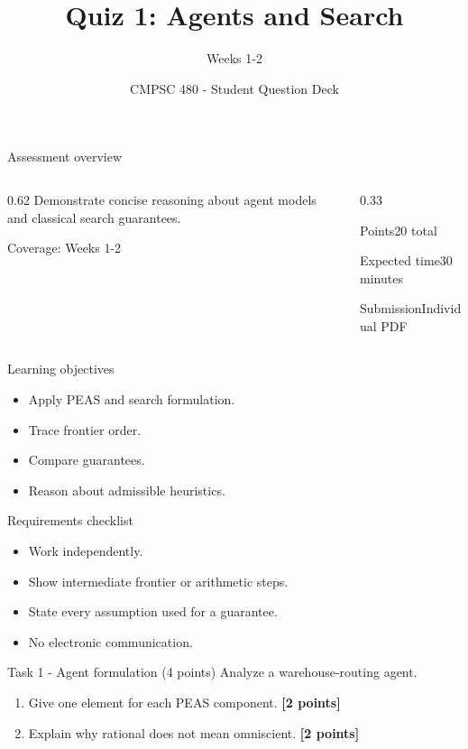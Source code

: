 \documentclass[aspectratio=169,11pt]{beamer}
\title[Quiz 1 Questions]{Quiz 1: Agents and Search}
\subtitle{Weeks 1-2}
\author{CMPSC 480 - Student Question Deck}
\date{}
\begin{document}
\begin{frame}
  \titlepage
\end{frame}

\begin{frame}{Assessment overview}
\begin{columns}[T,onlytextwidth]
\begin{column}{0.62\textwidth}
\Large Demonstrate concise reasoning about agent models and classical search guarantees.

\vspace{0.35cm}
\normalsize
Coverage: Weeks 1-2
\end{column}
\begin{column}{0.33\textwidth}
\begin{block}{Points}20 total\end{block}
\begin{block}{Expected time}30 minutes\end{block}
\begin{block}{Submission}Individual PDF\end{block}
\end{column}
\end{columns}
\end{frame}

\begin{frame}{Learning objectives}
\begin{itemize}
  \item Apply PEAS and search formulation.
  \item Trace frontier order.
  \item Compare guarantees.
  \item Reason about admissible heuristics.
\end{itemize}
\end{frame}

\begin{frame}{Requirements checklist}
\small
\begin{itemize}
  \item Work independently.
  \item Show intermediate frontier or arithmetic steps.
  \item State every assumption used for a guarantee.
  \item No electronic communication.
\end{itemize}
\end{frame}

\begin{frame}{Task 1 - Agent formulation (4 points)}
\small
Analyze a warehouse-routing agent.

\vspace{0.2cm}
\begin{enumerate}
\item[\textbf{a.}] Give one element for each PEAS component. \hfill{\color{courseblue}\textbf{[2 points]}}
\item[\textbf{b.}] Explain why rational does not mean omniscient. \hfill{\color{courseblue}\textbf{[2 points]}}
\end{enumerate}
\end{frame}
\end{document}
